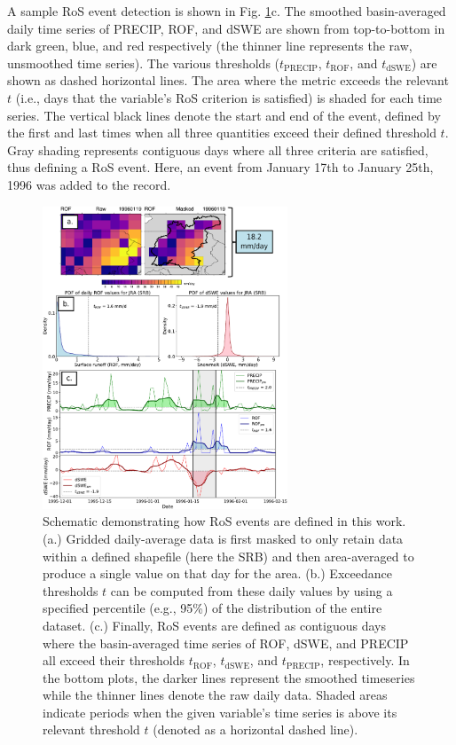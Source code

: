 \documentclass[nhess, manuscript]{copernicus}
\begin{document}
A sample RoS event detection is shown in Fig. \ref{fig:schematic}c.
The smoothed basin-averaged daily time series of PRECIP, ROF, and dSWE are shown from top-to-bottom in dark green, blue, and red respectively (the thinner line represents the raw, unsmoothed time series).
The various thresholds ($t_{\textrm{PRECIP}}$, $t_{\textrm{ROF}}$, and $t_{\textrm{dSWE}}$) are shown as dashed horizontal lines. The area where the metric exceeds the relevant $t$ (i.e., days that the variable's RoS criterion is satisfied) is shaded for each time series.
The vertical black lines denote the start and end of the event, defined by the first and last times when all three quantities exceed their defined threshold $t$.
Gray shading represents contiguous days where all three criteria are satisfied, thus defining a RoS event. Here, an event from January 17th to January 25th, 1996 was added to the record.

\begin{figure}
\noindent\includegraphics[width=0.65\textwidth]{figs/cropped/schematic.pdf}
\caption{Schematic demonstrating how RoS events are defined in this work. (a.) Gridded daily-average data is first masked to only retain data within a defined shapefile (here the SRB) and then area-averaged to produce a single value on that day for the area. (b.) Exceedance thresholds $t$ can be computed from these daily values by using a specified percentile (e.g., 95\%) of the distribution of the entire dataset. (c.) Finally, RoS events are defined as contiguous days where the basin-averaged time series of ROF, dSWE, and PRECIP all exceed their thresholds $t_{\textrm{ROF}}$, $t_{\textrm{dSWE}}$, and $t_{\textrm{PRECIP}}$, respectively. In the bottom plots, the darker lines represent the smoothed timeseries while the thinner lines denote the raw daily data. Shaded areas indicate periods when the given variable's time series is above its relevant threshold $t$ (denoted as a horizontal dashed line).}
\label{fig:schematic}
\end{figure}
\end{document}
